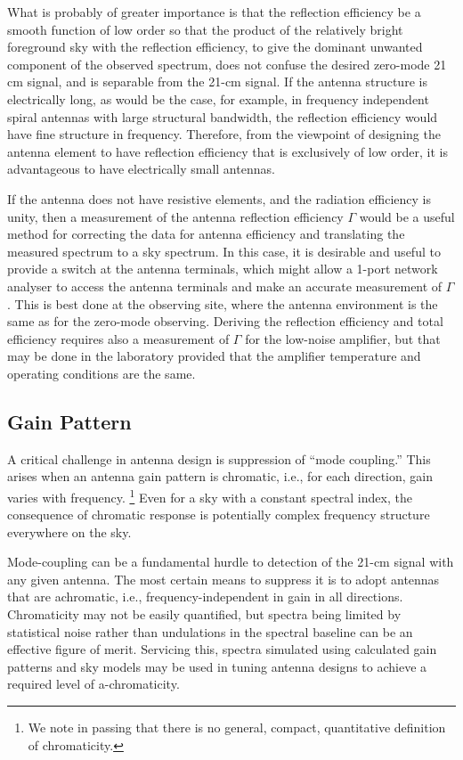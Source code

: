    What is probably of greater importance is that the reflection efficiency be a smooth function of low order so that the product of the relatively bright foreground sky with the reflection efficiency, to give the dominant unwanted component of the observed spectrum, does not confuse the desired zero-mode 21 cm signal, and is separable from the 21-cm signal.  If the antenna structure is electrically long, as would be the case, for example, in frequency independent spiral antennas with large structural bandwidth, the reflection efficiency would have fine structure in frequency.  Therefore, from the viewpoint of designing the antenna element to have reflection efficiency that is exclusively of low order, it is advantageous to have electrically small antennas.
   
   If the antenna does not have resistive elements, and the radiation efficiency is unity, then a measurement of the antenna reflection efficiency $\Gamma$ would be a useful method for correcting the data for antenna efficiency and translating the measured spectrum to a sky spectrum. In this case, it is desirable and useful to provide a switch at the antenna terminals, which might allow a 1-port network analyser to access the antenna terminals and make an accurate measurement of $\Gamma$.  This is best done at the observing site, where the antenna environment is the same as for the zero-mode observing.  Deriving the reflection efficiency and total efficiency requires also a measurement of $\Gamma$ for the low-noise amplifier, but that may be done in the laboratory provided that the amplifier temperature and operating conditions are the same.

\subsection{Gain Pattern}

A critical challenge in antenna design is suppression of ``mode coupling.'' This arises when an antenna gain pattern is chromatic, i.e., for each direction, gain varies with frequency. \footnote{We note in passing that there is no general, compact, quantitative definition of chromaticity.}   Even for a sky with a constant spectral index, the consequence of chromatic response is potentially complex frequency structure everywhere on the sky.  

Mode-coupling can be a fundamental hurdle to detection of the 21-cm signal with any given antenna.  The most certain means to suppress it is to adopt antennas that are achromatic, i.e., frequency-independent in gain in all directions.  Chromaticity may not be easily quantified, but spectra being limited by statistical noise rather than undulations in the spectral baseline can be an effective figure of merit.  Servicing this, spectra simulated using calculated gain patterns and sky models may be used in tuning antenna designs to achieve a required level of a-chromaticity.

